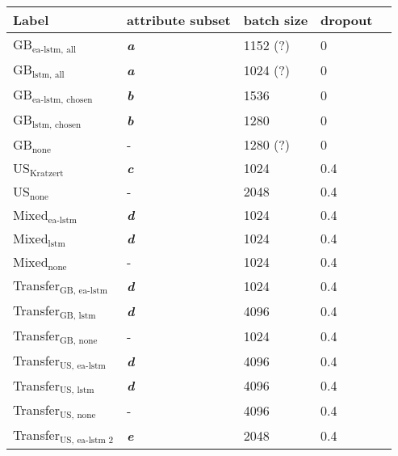 \begin{tabular}{lllll}
    \toprule
    Label & attribute subset & batch size & dropout \\
    \midrule
    GB$_\text{ea-lstm, all}$ & \textbf{\textit{a}} &  1152 (?)  & 0\\
    GB$_\text{lstm, all}$ & \textbf{\textit{a}} & 1024 (?) & 0  \\
    GB$_\text{ea-lstm, chosen}$ & \textbf{\textit{b}} & 1536 & 0 \\
    GB$_\text{lstm, chosen}$ & \textbf{\textit{b}} & 1280 & 0\\
    GB$_\text{none}$ & - & 1280 (?) & 0\\
    US$_\text{Kratzert}$  & \textbf{\textit{c}} & 1024 & 0.4 \\
    US$_\text{none}$  & - & 2048 & 0.4\\
    Mixed$_\text{ea-lstm}$ & \textbf{\textit{d}} & 1024 & 0.4\\
    Mixed$_\text{lstm}$ & \textbf{\textit{d}} & 1024 & 0.4\\
    Mixed$_\text{none}$ & - & 1024 & 0.4\\
    Transfer$_\text{GB, ea-lstm}$ & \textbf{\textit{d}}  & 1024 & 0.4 \\
    Transfer$_\text{GB, lstm}$ & \textbf{\textit{d}}  & 4096 & 0.4 \\
    Transfer$_\text{GB, none}$ & - & 1024 & 0.4 \\
    Transfer$_\text{US, ea-lstm}$ & \textbf{\textit{d}} & 4096 & 0.4 \\
    Transfer$_\text{US, lstm}$  & \textbf{\textit{d}} & 4096 & 0.4 \\ 
    Transfer$_\text{US, none}$  & - & 4096 & 0.4 \\
    Transfer$_\text{US, ea-lstm 2}$ & \textbf{\textit{e}} & 2048 & 0.4 \\
\bottomrule
\end{tabular}
